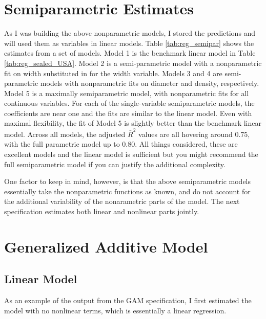 \documentclass[11pt]{paper}
\begin{document}
 

\pagebreak
\section{Semiparametric Estimates}

As I was building the above nonparametric models, 
I stored the predictions and will used them as variables in 
linear models. 
Table \ref{tab:reg_semipar} 
shows the estimates from a set of models. 
Model 1 is the benchmark linear model in 
Table \ref{tab:reg_sealed_USA}. 
Model 2 is a semi-parametric model
with a nonparametric fit on width
substituted in for the width variable.
Models 3 and 4 are semi-parametric models
with nonparametric fits on diameter and density, respectively.
Model 5 is a maximally semiparametric model, 
with nonparametric fits for all continuous variables. 
For each of the single-variable semiparametric models, 
the coefficients are near one
and the fits are similar to the linear model. 
Even with maximal flexibility, the fit of Model 5
is slightly better than the benchmark linear model. 
Across all models, the adjusted $\bar{R}^2$ values are all hovering around 0.75, 
with the full parametric model up to 0.80. 
All things considered, these are excellent models
and the linear model is sufficient
but you might recommend the full semiparametric model
if you can justify the additional complexity.

One factor to keep in mind, however,
is that the above semiparametric models
essentially take the nonparametric functions as known, 
and do not account for the additional variability of
the nonarametric parts of the model.
The next specification estimates both linear 
and nonlinear parts jointly. 




\pagebreak
\section{Generalized Additive Model}

\subsection{Linear Model}

As an example of the output from the GAM specification, 
I first estimated the model with no nonlinear terms, 
which is essentially a linear regression. 


\end{document}
